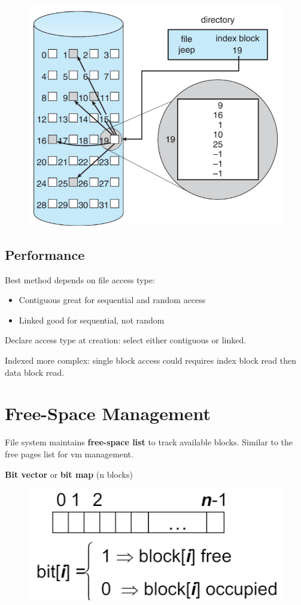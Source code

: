 \begin{figure}[h!]
    \centering
    \includegraphics[width=0.5\linewidth]{img/fbfbf.png}
\end{figure}


\subsection{Performance}

Best method depends on file access type:

\begin{itemize}
    \item Contiguous great for sequential and random access
    \item Linked good for sequential, not random
\end{itemize}

Declare access type at creation: select either contiguous or linked.

Indexed more complex: single block access could requires index block read then data block
read.


\section{Free-Space Management}

File system maintains \textbf{free-space list} to track available blocks. Similar to the free pages list for vm management.

\textbf{Bit vector} or \textbf{bit map} (n blocks)

\begin{figure}[h!]
    \centering
    \includegraphics[width=0.45\linewidth]{img/mngaz.png}
\end{figure}

